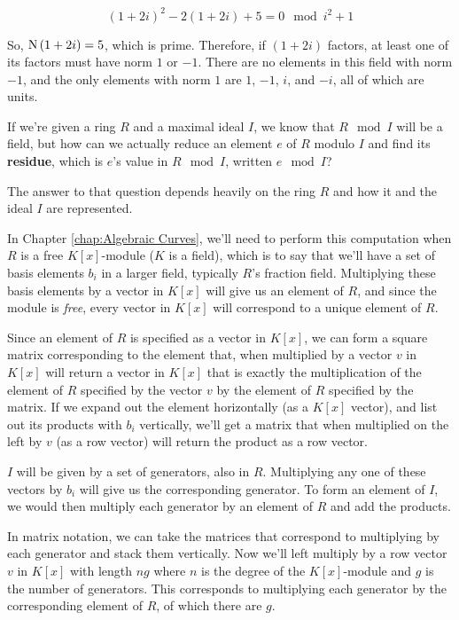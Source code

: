 $$(1+2i)^2 - 2(1+2i) +5 =0 \mod i^2+1$$

So, ${\rm N\,}(1+2i) = 5$, which is prime.  Therefore, if $(1+2i)$ factors,
at least one of its factors must have norm $1$ or $-1$.  There
are no elements in this field with norm $-1$, and the only
elements with norm $1$ are $1$, $-1$, $i$, and $-i$, all
of which are units.

\endexample

\vfill\eject


If we're given a ring $R$ and a maximal ideal $I$, we know that $R \mod I$ will be a field,
but how can we actually reduce an element $e$ of $R$ modulo $I$ and find its {\bf residue},
which is $e$'s value in $R \mod I$, written $e \mod I$?

The answer to that question depends heavily on the ring $R$ and how it and
the ideal $I$ are represented.

In Chapter \ref{chap:Algebraic Curves}, we'll need to perform this computation when
$R$ is %
a free $K[x]$-module ($K$ is a field), which is to say that we'll
have a set of basis elements $b_i$ in a larger field, typically $R$'s fraction field.
Multiplying these basis elements
by a vector in $K[x]$ will give us an element of $R$,
and since the module is {\it free}, every vector in $K[x]$ will correspond to a unique element of $R$.

Since an element of $R$ is specified as a vector in $K[x]$, we can form a square matrix corresponding to the element
that, when multiplied by a vector $v$ in $K[x]$ will return a vector in $K[x]$ that is exactly
the multiplication of the element of $R$ specified by the vector $v$ by the element of $R$ specified by the matrix.
If we expand out the element horizontally (as a $K[x]$ vector), and list out its products with $b_i$ vertically,
we'll get a matrix that when multiplied on the left by $v$ (as a row vector) will return the product
as a row vector.

$I$ will be given by a set of generators, also in $R$.  %
Multiplying any one of these vectors by $b_i$ will give us the corresponding generator.
To form an element of $I$, we would then multiply each generator by an element of $R$ and add the products.

In matrix notation, we can take the matrices that correspond to multiplying by each generator and stack
them vertically.  Now we'll left multiply by a row vector $v$ in $K[x]$ with length $ng$ where $n$ is the degree
of the $K[x]$-module and $g$ is the number of generators.  This corresponds to multiplying each generator
by the corresponding element of $R$, of which there are $g$.

